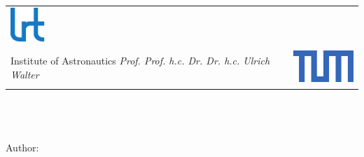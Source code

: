 \begin{titlepage}


	\begin{table}[ht!]
		\begin{tabularx}{\linewidth}{XX}
		\flushleft
		\includegraphics[height=13mm]{resources/tex/titlepage/images/Logo_LRT_neu_voll_A4.pdf}\\[3pt]
		{\small
		Institute of Astronautics\newline
		\textit{
		Prof. Prof. h.c. Dr. Dr. h.c.\newline
		Ulrich Walter}}
		&
		\flushright
		\includegraphics[height=13mm]{resources/tex/titlepage/images/TUM.pdf}
		\end{tabularx}
	\end{table}
	
	\vspace{30pt}
	
	\begin{center}
	{\fontsize{16}{16}\selectfont\bfseries
	\thesistype\\[8pt]
	\mytitle\\[12pt]}
	{\fontsize{16}{16}\selectfont
	\thesisnumber\\[8pt]
	Author:\\[8pt]
	\theauthor}
	\end{center}


\end{titlepage}
